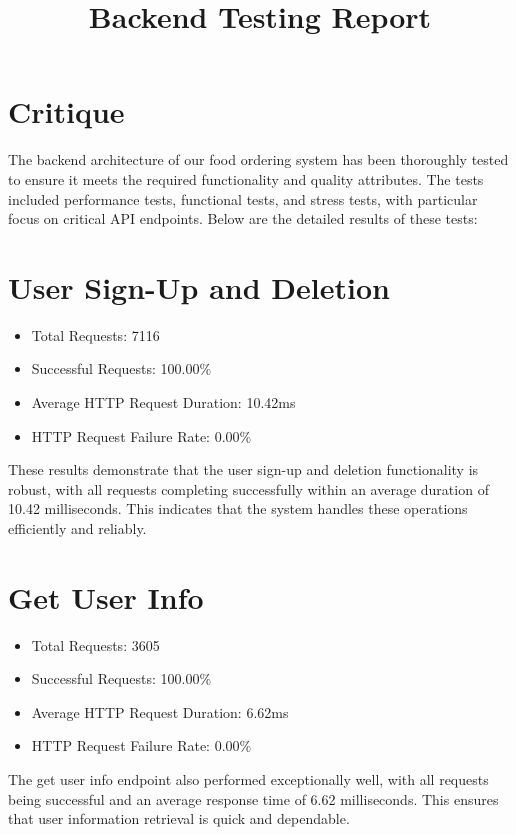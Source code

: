 \documentclass{article}
\begin{document}
\section{Critique}

\title{Backend Testing Report}

The backend architecture of our food ordering system has been thoroughly tested to ensure it meets the required functionality and quality attributes. The tests included performance tests, functional tests, and stress tests, with particular focus on critical API endpoints. Below are the detailed results of these tests:

\section{User Sign-Up and Deletion}

\begin{itemize}
  \item Total Requests: 7116
  \item Successful Requests: 100.00\%
  \item Average HTTP Request Duration: 10.42ms
  \item HTTP Request Failure Rate: 0.00\%
\end{itemize}

These results demonstrate that the user sign-up and deletion functionality is robust, with all requests completing successfully within an average duration of 10.42 milliseconds. This indicates that the system handles these operations efficiently and reliably.

\section{Get User Info}

\begin{itemize}
  \item Total Requests: 3605
  \item Successful Requests: 100.00\%
  \item Average HTTP Request Duration: 6.62ms
  \item HTTP Request Failure Rate: 0.00\%
\end{itemize}

The get user info endpoint also performed exceptionally well, with all requests being successful and an average response time of 6.62 milliseconds. This ensures that user information retrieval is quick and dependable.
\end{document}
